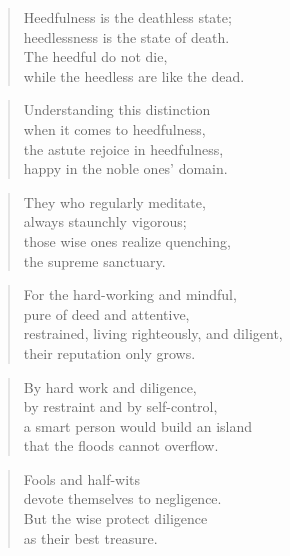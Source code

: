 \documentclass[12pt,openany]{book}%
\begin{document}
\begin{verse}%
Heedfulness is the deathless state; \\
heedlessness is the state of death. \\
The heedful do not die, \\
while the heedless are like the dead. 

%
\end{verse}

\begin{verse}%
Understanding this distinction \\
when it comes to heedfulness, \\
the astute rejoice in heedfulness, \\
happy in the noble ones’ domain. 

%
\end{verse}

\begin{verse}%
They who regularly meditate, \\
always staunchly vigorous; \\
those wise ones realize quenching, \\
the supreme sanctuary. 

%
\end{verse}

\begin{verse}%
For the hard-working and mindful, \\
pure of deed and attentive, \\
restrained, living righteously, and diligent, \\
their reputation only grows. 

%
\end{verse}

\begin{verse}%
By hard work and diligence, \\
by restraint and by self-control, \\
a smart person would build an island \\
that the floods cannot overflow. 

%
\end{verse}

\begin{verse}%
Fools and half-wits \\
devote themselves to negligence. \\
But the wise protect diligence \\
as their best treasure. 

%
\end{verse}
\end{document}
